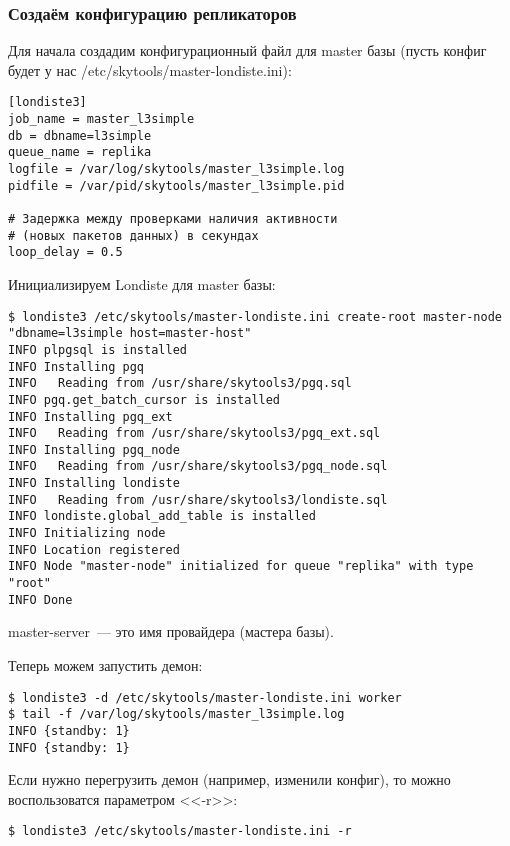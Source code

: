 \subsubsection{Создаём конфигурацию репликаторов}
Для начала создадим конфигурационный файл для master базы
(пусть конфиг будет у нас /etc/skytools/master-londiste.ini):
\begin{lstlisting}[label=lst:londiste-replica1,caption=Создаём конфигурацию репликатора]
[londiste3]
job_name = master_l3simple
db = dbname=l3simple
queue_name = replika
logfile = /var/log/skytools/master_l3simple.log
pidfile = /var/pid/skytools/master_l3simple.pid

# Задержка между проверками наличия активности
# (новых пакетов данных) в секундах
loop_delay = 0.5
\end{lstlisting}

Инициализируем Londiste для master базы:

\begin{lstlisting}[label=lst:londiste-replica2,caption=Инициализируем Londiste]
$ londiste3 /etc/skytools/master-londiste.ini create-root master-node "dbname=l3simple host=master-host"
INFO plpgsql is installed
INFO Installing pgq
INFO   Reading from /usr/share/skytools3/pgq.sql
INFO pgq.get_batch_cursor is installed
INFO Installing pgq_ext
INFO   Reading from /usr/share/skytools3/pgq_ext.sql
INFO Installing pgq_node
INFO   Reading from /usr/share/skytools3/pgq_node.sql
INFO Installing londiste
INFO   Reading from /usr/share/skytools3/londiste.sql
INFO londiste.global_add_table is installed
INFO Initializing node
INFO Location registered
INFO Node "master-node" initialized for queue "replika" with type "root"
INFO Done
\end{lstlisting}

master-server~--- это имя провайдера (мастера базы).

Теперь можем запустить демон:

\begin{lstlisting}[label=lst:londiste-replica3,caption=Запускаем демон для master базы]
$ londiste3 -d /etc/skytools/master-londiste.ini worker
$ tail -f /var/log/skytools/master_l3simple.log
INFO {standby: 1}
INFO {standby: 1}
\end{lstlisting}

Если нужно перегрузить демон (например, изменили конфиг), то можно воспользоватся параметром <<-r>>:

\begin{lstlisting}[label=lst:londiste-replica4,caption=Перегрузка демона]
$ londiste3 /etc/skytools/master-londiste.ini -r
\end{lstlisting}

